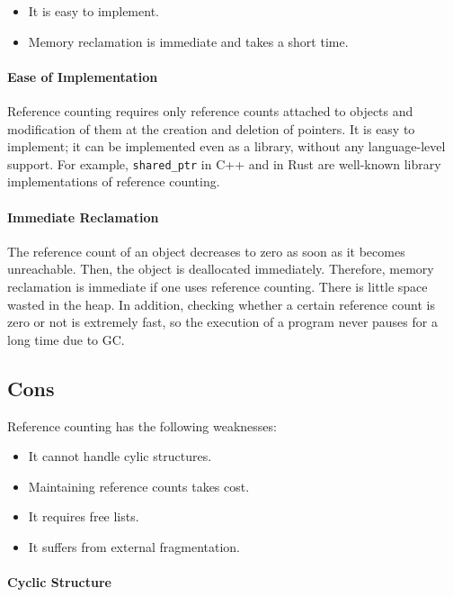 \begin{itemize}
  \item It is easy to implement.
  \item Memory reclamation is immediate and takes a short time.
\end{itemize}

\paragraph{Ease of Implementation}

Reference counting requires only reference counts attached to objects
and modification of them at the creation and deletion of pointers. It is
easy to implement; it can be implemented even as a library, without any
language-level support. For example,
\verb!shared_ptr!
in C++ and
 in
Rust are well-known library implementations of reference counting.

\paragraph{Immediate Reclamation}

The reference count of an object decreases to zero as soon as it becomes
unreachable. Then, the object is deallocated immediately. Therefore, memory
reclamation is immediate if one uses reference counting. There is little space
wasted in the heap. In addition, checking whether a certain reference count is
zero or not is extremely fast, so the execution of a program never pauses for a
long time due to GC.

\subsection{Cons}

Reference counting has the following weaknesses:

\begin{itemize}
  \item It cannot handle cylic structures.
  \item Maintaining reference counts takes cost.
  \item It requires free lists.
  \item It suffers from external fragmentation.
\end{itemize}

\paragraph{Cyclic Structure}

